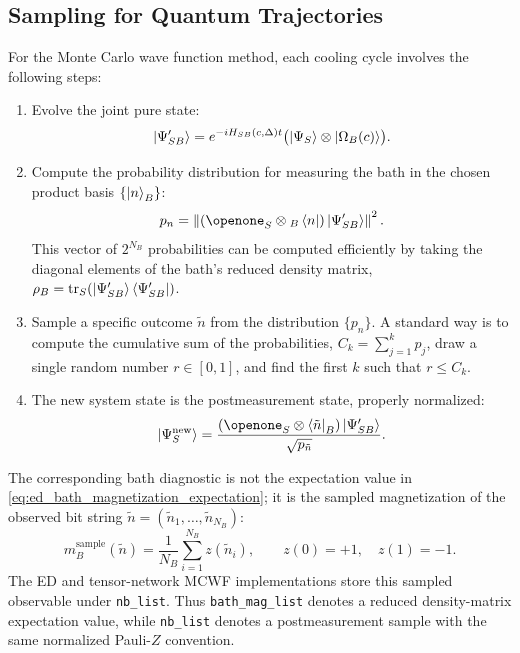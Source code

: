 \documentclass[aps,prx,twocolumn,superscriptaddress,nofootinbib,nolongbibliography,nobalancelastpage,10pt,floatfix]{revtex4-2}
\begin{document}
\subsection{Sampling for Quantum Trajectories}

For the Monte Carlo wave function method, each cooling cycle involves the following steps:
\begin{enumerate}
    \item Evolve the joint pure state:
          \[
              \ket{\Psi_{SB}'} =
              e^{-iH_{SB}(c,\Delta)t}\bigl(\ket{\Psi_S}\otimes\ket{\Omega_B(c)}\bigr).
          \]
    \item Compute the probability distribution for measuring the bath in the chosen product basis \(\{\ket{n}_B\}\):
          \begin{equation}
              p_n =
              \left\|(\Id_S \otimes {}_B\bra{n})\ket{\Psi_{SB}'}\right\|^2.
          \end{equation}
          This vector of $2^{N_B}$ probabilities can be computed efficiently by taking the diagonal elements of the bath's reduced density matrix, $\rho_B = \operatorname{tr}_S(\ket{\Psi_{SB}'}\bra{\Psi_{SB}'})$.
    \item Sample a specific outcome $\tilde{n}$ from the distribution $\{p_n\}$. A standard way is to compute the cumulative sum of the probabilities, $C_k = \sum_{j=1}^k p_j$, draw a single random number $r \in [0,1]$, and find the first $k$ such that $r \le C_k$.
    \item The new system state is the postmeasurement state, properly normalized:
          \begin{equation}
              \ket{\Psi_S^{\text{new}}} = \frac{(\Id_S \otimes \bra{\tilde{n}}_B) \ket{\Psi_{SB}'}}{\sqrt{p_{\tilde{n}}}}.
          \end{equation}
\end{enumerate}

The corresponding bath diagnostic is not the expectation value in
\cref{eq:ed_bath_magnetization_expectation}; it is the sampled magnetization
of the observed bit string \(\tilde n=(\tilde n_1,\ldots,\tilde n_{N_B})\):
\begin{equation}
    m_B^{\mathrm{sample}}(\tilde n)
    =\frac{1}{N_B}\sum_{i=1}^{N_B} z(\tilde n_i),
    \qquad
    z(0)=+1,\quad z(1)=-1.
    \label{eq:ed_bath_sample_magnetization}
\end{equation}
The ED and tensor-network MCWF implementations store this sampled observable
under \texttt{nb\_list}.  Thus \texttt{bath\_mag\_list} denotes a reduced
density-matrix expectation value, while \texttt{nb\_list} denotes a
postmeasurement sample with the same normalized Pauli-\(Z\) convention.




%
\end{document}
